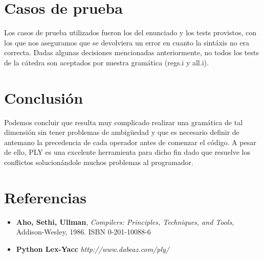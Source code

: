 \documentclass[10pt,a4paper]{article}
\begin{document}
\section{Casos de prueba}
Los casos de prueba utilizados fueron los del enunciado y los tests provistos, con los que nos aseguramos que se devolviera un error en cuanto la sintáxis no era correcta. Dadas algunas decisiones mencionadas anteriormente, no todos los tests de la cátedra son aceptados por nuestra gramática (regs.i y all.i).
\section{Conclusión}
Podemos concluir que resulta muy complicado realizar una gramática de tal dimensión sin tener problemas de ambigüedad y que es necesario definir de antemano la precedencia de cada operador antes de comenzar el código. A pesar de ello, PLY es una excelente herramienta para dicho fin dado que resuelve los conflictos solucionándole muchos problemas al programador.

\section{Referencias}
\begin{itemize}
\item \textbf{Aho, Sethi, Ullman}, \textit{Compilers: Principles, Techniques, and Tools}, Addison-Wesley, 1986. ISBN 0-201-10088-6

\item \textbf{Python Lex-Yacc} \textit{http://www.dabeaz.com/ply/}
\end{itemize}
\end{document}
